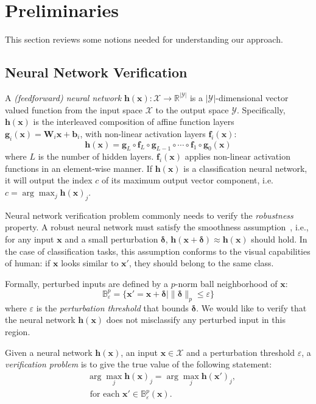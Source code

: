 \documentclass[runningheads]{llncs}
\newcommand{\myvec}[1]{\boldsymbol{#1}}
\newcommand{\mymatrix}[1]{\boldsymbol{#1}}
\newcommand{\comp}{\mathrel{\circ}}
\begin{document}
%
%
%

\section{Preliminaries}
\label{sec:pre}
This section reviews some notions needed for understanding our approach.


\subsection{Neural Network Verification}
A \emph{(feedforward) neural network} $\myvec{h}(\myvec{x}): \mathcal{X} \to
\mathbb{R}^{|\mathcal{Y}|}$ is a $|\mathcal{Y}|$-dimensional vector
valued function from the input space $\mathcal{X}$ to the output space
$\mathcal{Y}$.  Specifically, $\myvec{h}(\myvec{x})$ is the
interleaved composition of affine function layers
$\myvec{g}_i(\myvec{x})=\mymatrix{W}_i\myvec{x}+\myvec{b}_i$, with
non-linear activation layers $\myvec{f}_i(\myvec{x})$:
\[
\myvec{h}(\myvec{x}) = \myvec{g}_{L} \comp \myvec{f}_{L} \comp
\myvec{g}_{L-1} \comp \cdots \comp \myvec{f}_{1} \comp
\myvec{g}_{0}(\myvec{x})
\]
where $L$ is the number of hidden layers. 
$\myvec{f}_i(\myvec{x})$ applies non-linear activation functions in an element-wise manner. 
If $\myvec{h}(\myvec{x})$ is a classification neural network, it will
output the index $c$ of its maximum output vector component, i.e. $c =
\arg \max_{j} \myvec{h}(\myvec{x})_{j}$.

Neural network verification problem commonly needs to verify the
\emph{robustness} property.  A robust neural network must satisfy the
smoothness assumption~\cite{DBLP:books/daglib/0040158}, i.e., for any
input $\myvec{x}$ and a small perturbation $\myvec{\delta}$,
$\myvec{h}(\myvec{x} + \myvec{\delta}) \approx \myvec{h}(\myvec{x})$ should
 hold. In the case of classification tasks, this assumption conforms
to the visual capabilities of human: if $\myvec{x}$ looks similar to
$\myvec{x}'$, they should belong to the same class.

Formally, perturbed inputs are defined by a $p$-norm ball neighborhood
of $\myvec{x}$:
\[
\mathbb{B}^{p}_{\varepsilon} = \{\myvec{x}' = \myvec{x}
+ \myvec{\delta} \mid \|\myvec{\delta}\|_{p} \leq \varepsilon\}
\]
where $\varepsilon$ is the \emph{perturbation threshold} that bounds
$\myvec{\delta}$. We would like to verify that the neural network
$\myvec{h}(\myvec{x})$ does not misclassify any perturbed input in
this region.

\begin{definition}
Given a neural network $\myvec{h}(\myvec{x})$, an input
$\myvec{x}\in\mathcal{X}$ and a perturbation threshold $\varepsilon$, a
\emph{verification problem} is to give the true value of the
following statement:
\begin{equation}
\begin{aligned}
  &\arg \max_{j} \myvec{h}(\myvec{x})_{j} = \arg \max_{j}
  \myvec{h}(\myvec{x}')_{j},\\
 &\mbox{ for each } \myvec{x}' \in
  \mathbb{B}^{p}_{\varepsilon}(\myvec{x}).\nonumber
\end{aligned}
\end{equation}
\end{definition}
\end{document}
